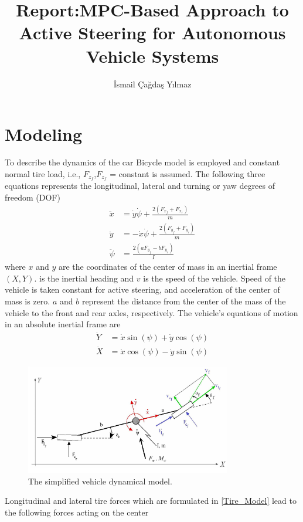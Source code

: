 \documentclass[12pt]{article}
\title{Report:MPC-Based Approach to Active Steering for Autonomous Vehicle Systems}
\author{İsmail Çağdaş Yılmaz}
\date{}
\begin{document}
\maketitle%

\section{Modeling}
\par To describe the dynamics of the car {\textquotesingle Bicycle model\textquotesingle} is employed  and  constant normal tire load, i.e.,  $F_{z_{f}}$,$F_{z_{f}}$ = constant is assumed. The following three equations represents the  longitudinal, lateral
and turning or yaw degrees of freedom (DOF)
\begin{subequations} 
	\label{eqn:longitudinal_lateral_yaw_second_derivative}
	\begin{align} \ddot{x} &= \dot{y}\dot{\psi} + \frac{2(F_{x_{f}}+F_{x_{r}})}{m} \label{eqn:longitudinal_second_derivative} \\ 
	\ddot{y} &= -\dot{x}\dot{\psi} + \frac{2(F_{y_{f}}+F_{y_{r}})}{m} \label{eqn:lateral_second_derivative} \\ 
	\ddot{\psi} &= \frac{2(aF_{y_{f}}-bF_{y_{r}})}{I} \label{eqn:yaw_second_derivative}
	\end{align} 
\end{subequations}
where $x$ and $y$ are the coordinates of the center of mass
 in an inertial frame $(X,Y)$. is the inertial heading and $v$
is the speed of the vehicle. Speed of the vehicle is taken constant for active steering, and acceleration of the center of mass is zero. $a$ and $b$ represent the distance
from the center of the mass of the vehicle to the front and
rear axles, respectively. The vehicle’s equations of motion in an absolute inertial frame are
\begin{subequations} 
	\begin{align} \dot{Y} &= \dot{x}\sin(\psi) + \dot{y}\cos(\psi)  \label{eqn:y_inertial_frame} \\ 
	\dot{X} &= \dot{x}\cos(\psi) - \dot{y}\sin(\psi) \label{eqn:x_inertial_frame} 
	\end{align} 
\end{subequations}
\begin{figure}[h]
	\centering
	\includegraphics[width=0.80\textwidth,keepaspectratio]{images/01_Vehicle_Dynamical_Model.pdf}
	\caption{The simplified vehicle dynamical model. \cite{Borrelli2005}}
	\label{fig_01:vehicle_dynamical_model}
\end{figure}
Longitudinal and lateral tire forces which are formulated in \ref{Tire_Model} lead to the following forces acting on the center
\end{document}

